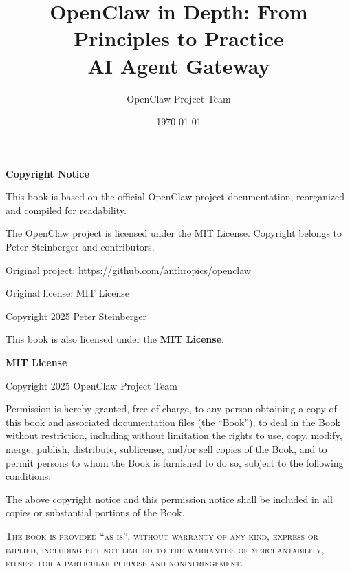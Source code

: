 \documentclass[a4paper,12pt,openany]{book}
\title{
    \vspace{2cm}
{\Huge\textbf{OpenClaw in Depth: From Principles to Practice}} \\
    \vspace{0.5cm}
    {\large AI Agent Gateway}
    \vspace{2cm}
}
\author{OpenClaw Project Team}
\date{\today}
\begin{document}
\maketitle
\thispagestyle{empty}

\clearpage
\thispagestyle{empty}
\vspace*{\fill}
\begin{center}
{\large\textbf{Copyright Notice}}
\end{center}

\bigskip

\noindent This book is based on the official OpenClaw project documentation, reorganized and compiled for readability.

\medskip

\noindent The OpenClaw project is licensed under the MIT License. Copyright belongs to Peter Steinberger and contributors.

\medskip

\noindent Original project: \url{https://github.com/anthropics/openclaw}

\noindent Original license: MIT License

\noindent Copyright \textcopyright{} 2025 Peter Steinberger

\bigskip

\noindent This book is also licensed under the \textbf{MIT License}.

\bigskip

\noindent \textbf{MIT License}

\medskip

\noindent Copyright \textcopyright{} 2025 OpenClaw Project Team

\medskip

\noindent Permission is hereby granted, free of charge, to any person obtaining a copy
of this book and associated documentation files (the ``Book''), to deal
in the Book without restriction, including without limitation the rights
to use, copy, modify, merge, publish, distribute, sublicense, and/or sell
copies of the Book, and to permit persons to whom the Book is furnished to
do so, subject to the following conditions:

\medskip

\noindent The above copyright notice and this permission notice shall be included in all
copies or substantial portions of the Book.

\medskip

\noindent \textsc{The book is provided ``as is'', without warranty of any kind, express or
implied, including but not limited to the warranties of merchantability,
fitness for a particular purpose and noninfringement.}

\vspace*{\fill}

\tableofcontents
\clearpage












\end{document}
